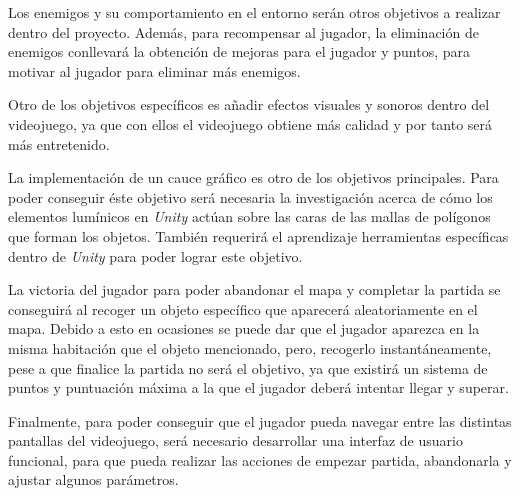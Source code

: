 Los enemigos y su comportamiento en el entorno serán otros objetivos a realizar dentro del proyecto. Además, para recompensar al jugador, la eliminación de enemigos conllevará la obtención de mejoras para el jugador y puntos, para motivar al jugador para eliminar más enemigos. 

Otro de los objetivos específicos es añadir efectos visuales y sonoros dentro del videojuego, ya que con ellos el videojuego obtiene más calidad y por tanto será más entretenido.

La implementación de un cauce gráfico es otro de los objetivos principales. Para poder conseguir éste objetivo será necesaria la investigación acerca de cómo los elementos lumínicos en \textit{Unity} actúan sobre las caras de las mallas de polígonos que forman los objetos. También requerirá el aprendizaje herramientas específicas dentro de \textit{Unity} para poder lograr este objetivo.

La victoria del jugador para poder abandonar el mapa y completar la partida se conseguirá al recoger un objeto específico que aparecerá aleatoriamente en el mapa. Debido a esto en ocasiones se puede dar que el jugador aparezca en la misma habitación que el objeto mencionado, pero, recogerlo instantáneamente, pese a que finalice la partida no será el objetivo, ya que existirá un sistema de puntos y puntuación máxima a la que el jugador deberá intentar llegar y superar.

Finalmente, para poder conseguir que el jugador pueda navegar entre las distintas pantallas del videojuego, será necesario desarrollar una interfaz de usuario funcional, para que pueda realizar las acciones de empezar partida, abandonarla y ajustar algunos parámetros.
